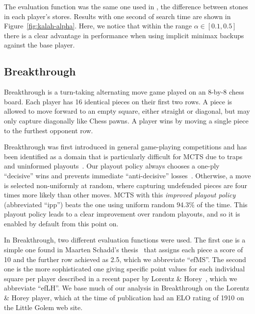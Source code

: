 \documentclass{article}
\begin{document}
The evaluation function was the same one used in \cite{Ramanujan11Tradeoffs}, the difference between stones
in each player's stores. Results with one 
second of search time are shown in Figure~\ref{fig:kalah-alpha}. 
Here, we notice that within the range $\alpha \in [0.1,0.5]$ there is a clear 
advantage in performance when using implicit minimax backups against the base player. 

\subsection{Breakthrough}
\label{sec:bt}

Breakthrough is a turn-taking alternating move game played on an 8-by-8 chess board. Each player 
has 16 identical pieces on their first two rows. 
A piece is allowed to move forward to an empty square, either straight or diagonal, but may only 
capture diagonally like Chess pawns. A player wins by moving a single piece to the furthest opponent row. 

Breakthrough was first introduced in general game-playing competitions and has been identified as a domain 
that is particularly difficult for MCTS due to traps and uninformed playouts~\cite{Gudmindsson13Sufficiency}. 
Our playout policy always chooses a one-ply ``decisive'' wins and prevents immediate ``anti-decisive'' 
losses~\cite{Teytaud10On}.
Otherwise, a move is selected non-uniformly at random, where capturing undefended pieces are four times more
likely than other moves. 
MCTS with this {\it improved playout policy} (abbreviated ``ipp'') beats the one using uniform random 
94.3\% of the time. This playout policy leads to a clear improvement over random playouts, and so it is enabled 
by default from this point on.

In Breakthrough, two different evaluation functions were used. The first one is a simple one found in 
Maarten Schadd's thesis~\cite{Schadd11PhdThesis} 
that assigns each piece a score of 10 and the further row achieved as 2.5, which we abbreviate ``efMS''. The second 
one is the more sophisticated one giving specific point values for each individual square per player 
described in a recent paper by Lorentz \& Horey~\cite{Lorentz13Breakthrough}, which we abbreviate ``efLH''. 
We base much of our analysis in Breakthrough on the Lorentz \& Horey player, which 
at the time of publication had an ELO rating of 1910 on the Little Golem web site. 
\end{document}
